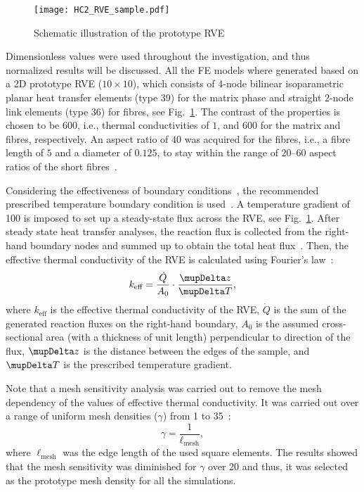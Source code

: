 \begin{figure}
\centering
\texttt{[image: HC2\_RVE\_sample.pdf]}
\caption{Schematic illustration of the prototype RVE}\label{fig:RVE5}
\end{figure}%

	Dimensionless values were used throughout the investigation, and thus normalized results will be discussed. All the FE models where generated based on a 2D prototype RVE ($10\times10$), which consists of 4-node bilinear isoparametric planar heat transfer elements (type 39) for the matrix phase and straight 2-node link elements (type 36) for fibres, see Fig.~\ref{fig:RVE5}. The contrast of the properties is chosen to be 600, i.e., thermal conductivities of $1$, and $600$ for the matrix and fibres, respectively. An aspect ratio of $40$ was acquired for the fibres, i.e., a fibre length of $5$ and a diameter of $0.125$, to stay within the range of $20$\thinspace--\thinspace$60$ aspect ratios of the short fibres~\autocite{Kalpakjian.2010}.
	
	Considering the effectiveness of boundary conditions~\autocite{Javanbakht.2017b}, the recommended prescribed temperature boundary condition is used~\autocite{Islam.1999}. A temperature gradient of 100 is imposed to set up a steady-state flux across the RVE, see Fig.~\ref{fig:RVE5}. After steady state heat transfer analyses, the reaction flux is collected from the right-hand boundary nodes and summed up to obtain the total heat flux~\autocite{Rakovsky.2014}. Then, the effective thermal conductivity of the RVE is calculated using Fourier's law~\autocite{Fiedler.2009}:
	\begin{equation}
	k_{\text{eff}}=\frac{\dot{Q}}{A_0}\cdot\frac{\mupDelta z}{\mupDelta T},
	\end{equation}%
	where $k_{\text{eff}}$ is the effective thermal conductivity of the RVE, $\dot{Q}$ is the sum of the generated reaction fluxes on the right-hand boundary, $A_0$ is the assumed cross-sectional area (with a thickness of unit length) perpendicular to direction of the flux, $\mupDelta z$ is the distance between the edges of the sample, and $\mupDelta T$ is the prescribed temperature gradient.

Note that a mesh sensitivity analysis was carried out to remove the mesh dependency of the values of effective thermal conductivity. It was carried out over a range of uniform mesh densities ($\gamma$) from 1 to 35~\autocite{Javanbakht.2018}:
\begin{equation}
\gamma=\frac{1}{\ell_\text{mesh}},
\end{equation}
where $\ell_\text{mesh}$ was the edge length of the used square elements. The results showed that the mesh sensitivity was diminished for $\gamma$ over 20 and thus, it was selected as the prototype mesh density for all the simulations.

